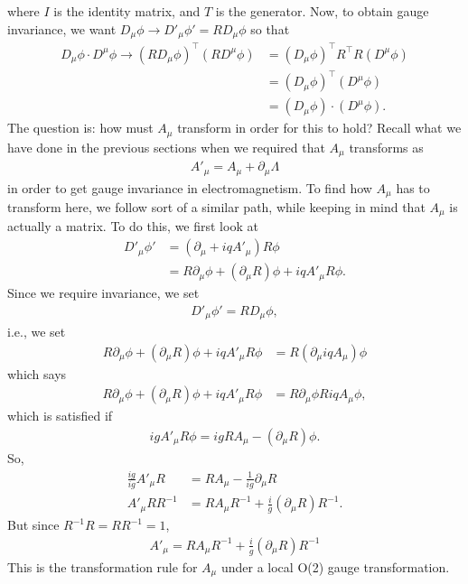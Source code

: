 \documentclass{book}
\numberwithin{equation}{section}
\theoremstyle{definition}
\newcommand{\p}{\partial}
\begin{document}
where $I$ is the identity matrix, and $T$ is the generator. Now, to obtain gauge invariance, we want $D_\mu\phi \to D'_\mu\phi' = RD_\mu\phi$ so that
\begin{align}
D_\mu\phi \cdot D^\mu\phi \to \left(RD_\mu\phi\right)^\top \left(RD^\mu\phi\right) &=  (D_\mu\phi)^\top R^\top R (D^\mu\phi)\\
&= (D_\mu\phi)^\top(D^\mu\phi)\\
&= (D_\mu\phi)\cdot(D^\mu\phi).
\end{align}
The question is: how must $A_\mu$ transform in order for this to hold? Recall what we have done in the previous sections when we required that $A_\mu$ transforms as
\begin{align}
A'_\mu = A_\mu + \p_\mu\Lambda
\end{align}
in order to get gauge invariance in electromagnetism. To find how $A_\mu$ has to transform here, we follow sort of a similar path, while keeping in mind that $A_\mu$ is actually a matrix. To do this, we first look at
\begin{align}
D'_\mu\phi' &= (\p_\mu + iqA'_\mu)R\phi\\
&= R\p_\mu\phi + (\p_\mu R)\phi + iqA'_\mu R\phi.
\end{align}
Since we require invariance, we set
\begin{align}
D'_\mu\phi' = RD_\mu\phi,
\end{align}
i.e., we set
\begin{align}
R\p_\mu\phi + (\p_\mu R)\phi + iqA'_\mu R\phi &= R(\p_\mu iqA_\mu)\phi 
\end{align}
which says
\begin{align}
R\p_\mu\phi + (\p_\mu R)\phi + iqA'_\mu R\phi &= R\p_\mu\phi  RiqA_\mu\phi,
\end{align}
which is satisfied if
\begin{align}
igA'_\mu R\phi = igRA_\mu - (\p_\mu R)\phi.
\end{align}
So,
\begin{align}
\frac{ig}{ig}A'_\mu R &= RA_\mu - \frac{1}{ig}\p_\mu R\\
A'_\mu RR^{-1} &= RA_\mu R^{-1} + \frac{i}{g}(\p_\mu R)R^{-1}.
\end{align}
But since $R^{-1}R = RR^{-1} = 1$,
\begin{align}
\boxed{A'_\mu = RA_\mu R^{-1} + \frac{i}{g}(\p_\mu R)R^{-1}}
\end{align}
This is the transformation rule for $A_\mu$ under a local O(2) gauge transformation.\\
\end{document}
